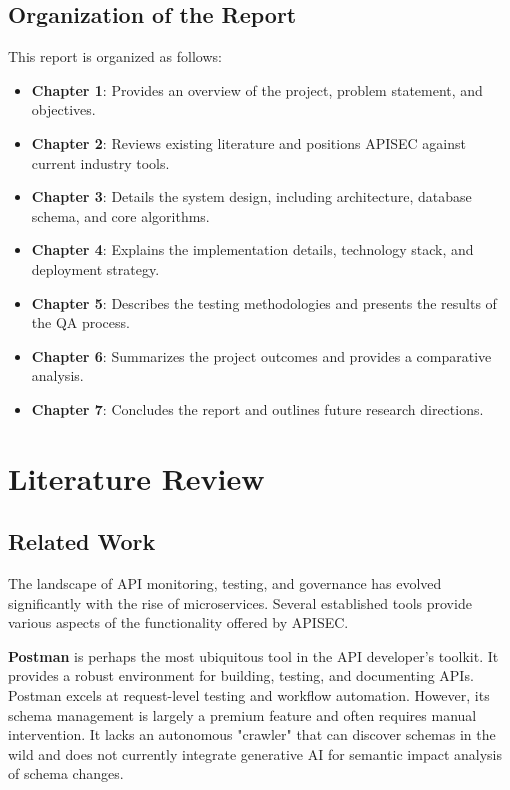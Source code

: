 \documentclass{fisatprojectfinal}
\begin{document}
\section{Organization of the Report}
This report is organized as follows:
\begin{itemize}
    \item \textbf{Chapter 1}: Provides an overview of the project, problem statement, and objectives.
    \item \textbf{Chapter 2}: Reviews existing literature and positions APISEC against current industry tools.
    \item \textbf{Chapter 3}: Details the system design, including architecture, database schema, and core algorithms.
    \item \textbf{Chapter 4}: Explains the implementation details, technology stack, and deployment strategy.
    \item \textbf{Chapter 5}: Describes the testing methodologies and presents the results of the QA process.
    \item \textbf{Chapter 6}: Summarizes the project outcomes and provides a comparative analysis.
    \item \textbf{Chapter 7}: Concludes the report and outlines future research directions.
\end{itemize}


\chapter{Literature Review}

\section{Related Work}
The landscape of API monitoring, testing, and governance has evolved significantly with the rise of microservices. Several established tools provide various aspects of the functionality offered by APISEC.

\textbf{Postman} \cite{postman} is perhaps the most ubiquitous tool in the API developer's toolkit. It provides a robust environment for building, testing, and documenting APIs. Postman excels at request-level testing and workflow automation. However, its schema management is largely a premium feature and often requires manual intervention. It lacks an autonomous "crawler" that can discover schemas in the wild and does not currently integrate generative AI for semantic impact analysis of schema changes.
\end{document}
